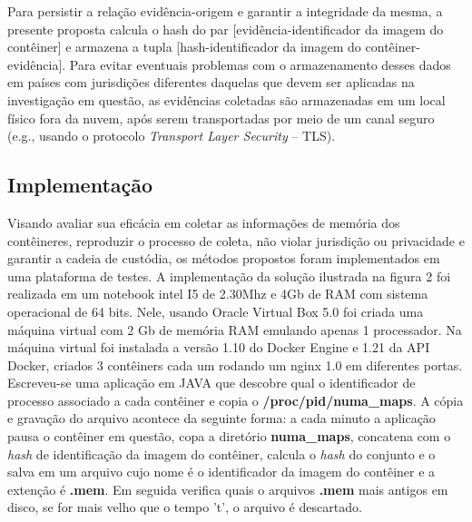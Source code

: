 \documentclass[conference]{IEEEtran}
\newcommand{\marcosT}[1]{{\color{red}{TODO: #1}}}
\begin{document}
\marcosT{Essa frase não faz sentido: não se ``assina'' nada com um ``hash''. Você pode ``calcular o hash'' ou ``assinar um dado'' (e.g., um dado juntamente com o hash de alguma coisa). Revise essa frase... - Hamilton: Feito}
Para persistir a relação evidência-origem e garantir a integridade da mesma, a presente proposta calcula o hash do par [evidência-identificador da imagem do contêiner] e armazena a tupla [hash-identificador da imagem do contêiner-evidência].
%
Para evitar eventuais problemas com o armazenamento desses dados em países com jurisdições diferentes daquelas que devem ser aplicadas na investigação em questão, as evidências coletadas são armazenadas em um local físico fora da nuvem, após serem transportadas por meio de um canal seguro (e.g., usando o protocolo \textit{Transport Layer Security} -- TLS).
%

%

\subsection{Implementação}

\marcosT{CLAREZA: quais ataques? Onde estão esses objetivos (diga a seção!!!)? Perceba que não tem qualquer seção com esse nome: você espera realmente que o leitor procure no seu texto onde eles estão...? - Hamilton: Feito}
Visando avaliar sua eficácia em coletar as informações de memória dos contêineres, reproduzir o processo de coleta, não violar jurisdição ou privacidade e garantir a cadeia de custódia, os métodos propostos foram implementados em uma plataforma de testes.
%
A implementação da solução ilustrada na figura 2 foi realizada em um notebook intel I5 de 2.30Mhz e 4Gb de RAM com sistema operacional de 64 bits. 
%
Nele, usando Oracle Virtual Box 5.0 foi criada uma máquina virtual com 2 Gb de memória RAM emulando apenas 1 processador.
%
Na máquina virtual foi instalada a versão 1.10 do Docker Engine e 1.21 da API Docker, criados 3 contêiners cada um rodando um nginx 1.0 em diferentes portas. 
%
Escreveu-se uma aplicação em JAVA que descobre qual o identificador de processo associado a cada contêiner e copia o \textbf{/proc/pid/numa\_maps}.
%
A cópia e gravação do arquivo acontece da seguinte forma: a cada minuto a aplicação pausa o contêiner em questão, copa a diretório \textbf{numa\_maps}, concatena com o \textit{hash} de identificação da imagem do contêiner, calcula o \textit{hash} do conjunto e o salva em um arquivo cujo nome é o identificador da imagem do contêiner e a extenção é \textbf{.mem}. 
%
Em seguida verifica quais o arquivos \textbf{.mem} mais antigos em disco, se for mais velho que o tempo 't', o arquivo é descartado.
\end{document}
